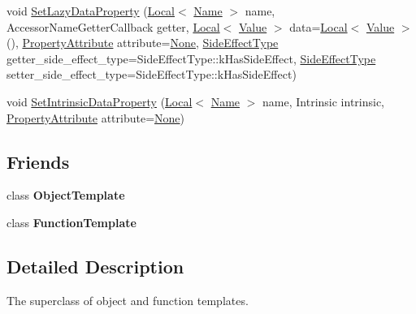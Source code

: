 \begin{DoxyCompactItemize}
\item 
void \mbox{\hyperlink{classv8_1_1Template_ab306ba858f4e71a25ebba4380ea5791f}{Set\+Lazy\+Data\+Property}} (\mbox{\hyperlink{classv8_1_1Local}{Local}}$<$ \mbox{\hyperlink{classv8_1_1Name}{Name}} $>$ name, Accessor\+Name\+Getter\+Callback getter, \mbox{\hyperlink{classv8_1_1Local}{Local}}$<$ \mbox{\hyperlink{classv8_1_1Value}{Value}} $>$ data=\mbox{\hyperlink{classv8_1_1Local}{Local}}$<$ \mbox{\hyperlink{classv8_1_1Value}{Value}} $>$(), \mbox{\hyperlink{namespacev8_a05f25f935e108a1ea2d150e274602b87}{Property\+Attribute}} attribute=\mbox{\hyperlink{namespacev8_a05f25f935e108a1ea2d150e274602b87a7ab4d58719c33b3ea2dfaefa29b111df}{None}}, \mbox{\hyperlink{namespacev8_a29711319c2b9fc7716d65faee2f7b9cb}{Side\+Effect\+Type}} getter\+\_\+side\+\_\+effect\+\_\+type=Side\+Effect\+Type\+::k\+Has\+Side\+Effect, \mbox{\hyperlink{namespacev8_a29711319c2b9fc7716d65faee2f7b9cb}{Side\+Effect\+Type}} setter\+\_\+side\+\_\+effect\+\_\+type=Side\+Effect\+Type\+::k\+Has\+Side\+Effect)
\item 
void \mbox{\hyperlink{classv8_1_1Template_aef172ef714818a210d815de389a5ab77}{Set\+Intrinsic\+Data\+Property}} (\mbox{\hyperlink{classv8_1_1Local}{Local}}$<$ \mbox{\hyperlink{classv8_1_1Name}{Name}} $>$ name, Intrinsic intrinsic, \mbox{\hyperlink{namespacev8_a05f25f935e108a1ea2d150e274602b87}{Property\+Attribute}} attribute=\mbox{\hyperlink{namespacev8_a05f25f935e108a1ea2d150e274602b87a7ab4d58719c33b3ea2dfaefa29b111df}{None}})
\end{DoxyCompactItemize}
\subsection*{Friends}
\begin{DoxyCompactItemize}
\item 
\mbox{\label{classv8_1_1Template_a4d28646409234f556983be8a96c06424}} 
class {\bfseries Object\+Template}
\item 
\mbox{\label{classv8_1_1Template_a334168ad1a5f39cf17b818ca3356aacd}} 
class {\bfseries Function\+Template}
\end{DoxyCompactItemize}


\subsection{Detailed Description}
The superclass of object and function templates. 

